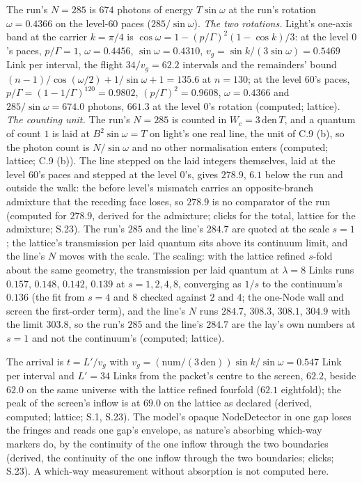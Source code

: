 \documentclass[pdflatex,sn-mathphys-num]{sn-jnl}
\newcommand{\num}{\mathrm{num}}
\newcommand{\den}{\mathrm{den}}
\theoremstyle{thmstyleone}
\begin{document}
The run's $N = 285$ is $674$ photons of energy $T\sin\omega$ at the run's rotation $\omega = 0.4366$ on the level-$60$ paces ($285 / \sin\omega$). \emph{The two rotations.} Light's one-axis band at the carrier $k = \pi / 4$ is $\cos\omega = 1 - (p / \Gamma)^2 (1 - \cos k) / 3$: at the level $0$'s paces, $p / \Gamma = 1$, $\omega = 0.4456$, $\sin\omega = 0.4310$, $v_g = \sin k / (3\sin\omega) = 0.5469$ Link per interval, the flight $34 / v_g = 62.2$ intervals and the remainders' bound $(n - 1) / \cos(\omega / 2) + 1 / \sin\omega + 1 = 135.6$ at $n = 130$; at the level $60$'s paces, $p / \Gamma = (1 - 1 / \Gamma)^{120} = 0.9802$, $(p / \Gamma)^2 = 0.9608$, $\omega = 0.4366$ and $285 / \sin\omega = 674.0$ photons, $661.3$ at the level $0$'s rotation (computed; lattice). \emph{The counting unit.} The run's $N = 285$ is counted in $W_c = 3\,\den\,T$, and a quantum of count $1$ is laid at $B^2\sin\omega = T$ on light's one real line, the unit of C.9 (b), so the photon count is $N / \sin\omega$ and no other normalisation enters (computed; lattice; C.9 (b)). The line stepped on the laid integers themselves, laid at the level $60$'s paces and stepped at the level $0$'s, gives $278.9$, $6.1$ below the run and outside the walk: the before level's mismatch carries an opposite-branch admixture that the receding face loses, so $278.9$ is no comparator of the run (computed for $278.9$, derived for the admixture; clicks for the total, lattice for the admixture; S.23). The run's $285$ and the line's $284.7$ are quoted at the scale $s = 1$; the lattice's transmission per laid quantum sits above its continuum limit, and the line's $N$ moves with the scale. The scaling: with the lattice refined $s$-fold about the same geometry, the transmission per laid quantum at $\lambda = 8$ Links runs $0.157$, $0.148$, $0.142$, $0.139$ at $s = 1, 2, 4, 8$, converging as $1 / s$ to the continuum's $0.136$ (the fit from $s = 4$ and $8$ checked against $2$ and $4$; the one-Node wall and screen the first-order term), and the line's $N$ runs $284.7$, $308.3$, $308.1$, $304.9$ with the limit $303.8$, so the run's $285$ and the line's $284.7$ are the lay's own numbers at $s = 1$ and not the continuum's (computed; lattice).

The arrival is $t = L' / v_g$ with $v_g = (\num / (3\,\den))\sin k / \sin\omega = 0.547$ Link per interval and $L' = 34$ Links from the packet's centre to the screen, $62.2$, beside $62.0$ on the same universe with the lattice refined fourfold ($62.1$ eightfold); the peak of the screen's inflow is at $69.0$ on the lattice as declared (derived, computed; lattice; S.1, S.23). The model's opaque NodeDetector in one gap loses the fringes and reads one gap's envelope, as nature's absorbing which-way markers do, by the continuity of the one inflow through the two boundaries (derived, the continuity of the one inflow through the two boundaries; clicks; S.23). A which-way measurement without absorption is not computed here.
\end{document}
